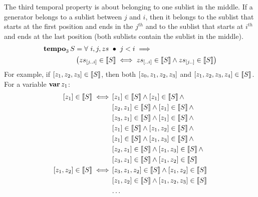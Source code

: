 %
%

The third temporal property is about belonging to one sublist in the middle.
If a generator belongs to a sublist between $j$ and $i$, then it belongs to the sublist that starts at the first position and ends in the $j^{th}$ and to the sublist that starts at $i^{th}$ and ends at the last position (both sublists contain the sublist in the middle).
%
\begin{align}
\tempo[3]{S} &= \forall~ i, j, zs ~\bullet~
j < i \implies \nonumber\\
&\left(
\slice{zs}{j}{i} \in \denote{S} \iff \sliceright{zs}{i} \in \denote{S} \land \sliceleft{zs}{j} \in \denote{S}
\right)\label{def:tempo3}
\end{align}
%
For example, if $\listsin{z_1,z_2,z_3} \in \denote{S}$, then both $\listsin{z_0,z_1,z_2,z_3}$ and $\listsin{z_1,z_2,z_3,z_4} \in \denote{S}$.
For a variable $\var{z_1}$:
%
%
\begin{align}
\listsin{z_1} \in \denote{S} \iff &
  \listsin{z_1} \in \denote{S} \land \listsin{z_1} \in \denote{S}\land\nonumber\\
  & \listsin{z_2,z_1} \in \denote{S} \land \listsin{z_1} \in \denote{S} \land\nonumber\\
  & \listsin{z_3,z_1} \in \denote{S} \land \listsin{z_1} \in \denote{S} \land\nonumber\\
  & \listsin{z_1} \in \denote{S} \land \listsin{z_1,z_2} \in \denote{S} \land\nonumber\\
  & \listsin{z_1} \in \denote{S} \land \listsin{z_1,z_3} \in \denote{S} \land\nonumber\\
  & \listsin{z_2,z_1} \in \denote{S} \land \listsin{z_1,z_3} \in \denote{S}\land\nonumber\\
  & \listsin{z_3,z_1} \in \denote{S} \land \listsin{z_1,z_2} \in \denote{S}\nonumber\\
\listsin{z_1,z_2} \in \denote{S} \iff &
  \listsin{z_3,z_1,z_2} \in \denote{S} \land \listsin{z_1,z_2} \in \denote{S}\nonumber\\
  & \listsin{z_1,z_2} \in \denote{S} \land \listsin{z_1,z_2,z_3} \in \denote{S}\nonumber\\
  & \ldots\nonumber
\end{align}

